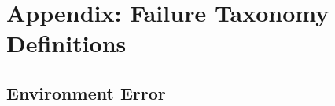 \documentclass[11pt]{article}
\begin{document}


\clearpage
\twocolumn


\section{Appendix: Failure Taxonomy Definitions} \label{app:1}

\subsection{Environment Error}
\end{document}
